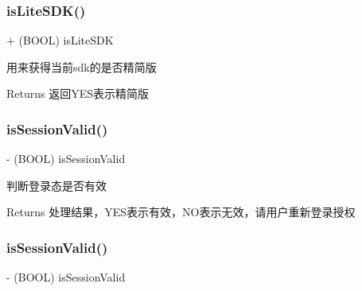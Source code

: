 \subsubsection{\texorpdfstring{is\+Lite\+S\+D\+K()}{isLiteSDK()}\hspace{0.1cm}{\footnotesize\ttfamily [2/2]}}
{\footnotesize\ttfamily + (B\+O\+OL) is\+Lite\+S\+DK \begin{DoxyParamCaption}{ }\end{DoxyParamCaption}}

用来获得当前sdk的是否精简版 \begin{DoxyReturn}{Returns}
返回\+Y\+E\+S表示精简版 
\end{DoxyReturn}
\mbox{\label{interface_tencent_o_auth_ae8ab093ff77ef33286e1809736d2609b}} 
\subsubsection{\texorpdfstring{is\+Session\+Valid()}{isSessionValid()}\hspace{0.1cm}{\footnotesize\ttfamily [1/2]}}
{\footnotesize\ttfamily -\/ (B\+O\+OL) is\+Session\+Valid \begin{DoxyParamCaption}{ }\end{DoxyParamCaption}}

判断登录态是否有效 \begin{DoxyReturn}{Returns}
处理结果，\+Y\+E\+S表示有效，\+N\+O表示无效，请用户重新登录授权 
\end{DoxyReturn}
\mbox{\label{interface_tencent_o_auth_ae8ab093ff77ef33286e1809736d2609b}} 
\subsubsection{\texorpdfstring{is\+Session\+Valid()}{isSessionValid()}\hspace{0.1cm}{\footnotesize\ttfamily [2/2]}}
{\footnotesize\ttfamily -\/ (B\+O\+OL) is\+Session\+Valid \begin{DoxyParamCaption}{ }\end{DoxyParamCaption}}

